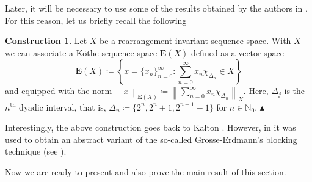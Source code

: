 \documentclass[11pt]{amsart}
\theoremstyle{definition}
\theoremstyle{definition}
\theoremstyle{definition}
\theoremstyle{definition}
\theoremstyle{definition}
\theoremstyle{definition}
\theoremstyle{definition}
\theoremstyle{definition}
\numberwithin{equation}{section}
\numberwithin{equation}{section}
\numberwithin{equation}{section}
\theoremstyle{definition}
\theoremstyle{definition}
\theoremstyle{definition}
\theoremstyle{definition}
\theoremstyle{definition}
\newtheorem{construction}[theorem]{Construction}
\theoremstyle{definition}
\newcommand{\norm}[1]{\left\lVert#1\right\rVert}
\newcommand\xqed[1]{%
	\leavevmode\unskip\penalty9999 \hbox{}\nobreak\hfill
	\quad\hbox{#1}}
\newcommand\demo{\xqed{{\Large $\blacktriangle$}}}
\begin{document}
Later, it will be necessary to use some of the results obtained by the authors in \cite{KT24}.
For this reason, let us briefly recall the following

\begin{construction}
	Let $X$ be a rearrangement invariant sequence space.
	With $X$ we can associate a K{\" o}the sequence space $\mathbf{E}(X)$ defined as a vector space
	\begin{equation*} \label{Def: E(X) function}
		\mathbf{E}(X) \coloneqq \left\{ x = \{x_n\}_{n=0}^{\infty} \colon \sum_{n=0}^{\infty} x_n \chi_{\Delta_n} \in X \right\}
	\end{equation*}
	and equipped with the norm  $\norm{x}_{\mathbf{E}(X)} \coloneqq \norm{ \sum_{n=0}^{\infty} x_n \chi_{\Delta_n} }_X$.
	Here, $\Delta_j$ is the $n^{\text{th}}$ dyadic interval, that is, $\Delta_n \coloneqq \{ 2^{n}, 2^{n}+1, 2^{n+1}-1 \}$ for $n \in \mathbb{N}_0$.
	\demo
\end{construction}

Interestingly, the above construction goes back to Kalton \cite{Ka93a}.
However, in \cite{KT24} it was used to obtain an abstract variant of the so-called Grosse-Erdmann's blocking technique (see \cite{GE98}).

Now we are ready to present and also prove the main result of this section.
\end{document}
